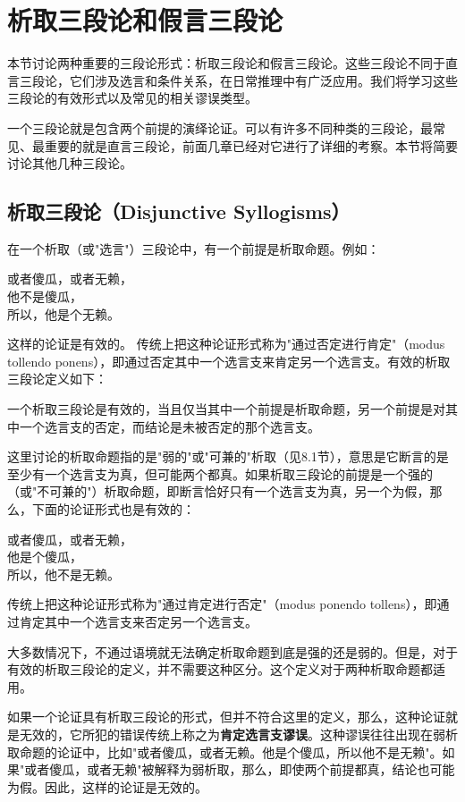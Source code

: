 \section{析取三段论和假言三段论}

\begin{logicbox}[title=引言]
本节讨论两种重要的三段论形式：析取三段论和假言三段论。这些三段论不同于直言三段论，它们涉及选言和条件关系，在日常推理中有广泛应用。我们将学习这些三段论的有效形式以及常见的相关谬误类型。
\end{logicbox}

一个三段论就是包含两个前提的演绎论证。可以有许多不同种类的三段论，最常见、最重要的就是直言三段论，前面几章已经对它进行了详细的考察。本节将简要讨论其他几种三段论。

\subsection{析取三段论（Disjunctive Syllogisms）}
在一个析取（或"选言"）三段论中，有一个前提是析取命题。例如：

或者傻瓜，或者无赖，\\
他不是傻瓜，\\
所以，他是个无赖。

这样的论证是有效的。\cite{boole1854} 传统上把这种论证形式称为"通过否定进行肯定"（modus tollendo ponens），即通过否定其中一个选言支来肯定另一个选言支。有效的析取三段论定义如下：

一个析取三段论是有效的，当且仅当其中一个前提是析取命题，另一个前提是对其中一个选言支的否定，而结论是未被否定的那个选言支。

这里讨论的析取命题指的是"弱的"或"可兼的"析取（见8.1节），意思是它断言的是至少有一个选言支为真，但可能两个都真。如果析取三段论的前提是一个强的（或"不可兼的"）析取命题，即断言恰好只有一个选言支为真，另一个为假，那么，下面的论证形式也是有效的：

或者傻瓜，或者无赖，\\
他是个傻瓜，\\
所以，他不是无赖。

传统上把这种论证形式称为"通过肯定进行否定"（modus ponendo tollens），即通过肯定其中一个选言支来否定另一个选言支。

大多数情况下，不通过语境就无法确定析取命题到底是强的还是弱的。但是，对于有效的析取三段论的定义，并不需要这种区分。这个定义对于两种析取命题都适用。

如果一个论证具有析取三段论的形式，但并不符合这里的定义，那么，这种论证就是无效的，它所犯的错误传统上称之为\textbf{肯定选言支谬误}。这种谬误往往出现在弱析取命题的论证中，比如"或者傻瓜，或者无赖。他是个傻瓜，所以他不是无赖"。如果"或者傻瓜，或者无赖"被解释为弱析取，那么，即使两个前提都真，结论也可能为假。因此，这样的论证是无效的。

